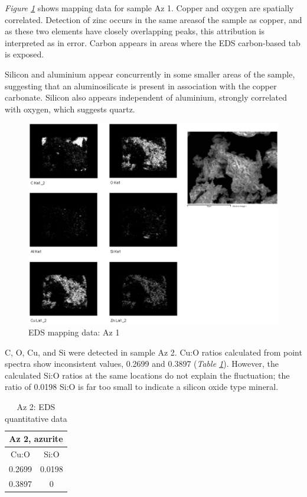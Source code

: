 \textit{Figure \ref{fig:az1_map1}} shows mapping data for sample Az 1. Copper and oxygen are spatially correlated. Detection of zinc occurs in the same areasof the sample as copper, and as these two elements have closely overlapping peaks, this attribution is interpreted as in error. Carbon appears in areas where the EDS carbon-based tab is exposed.

Silicon and aluminium appear concurrently in some smaller areas of the sample, suggesting that an aluminosilicate is present in association with the copper carbonate. Silicon also appears independent of aluminium, strongly correlated with oxygen, which suggests quartz. 

\begin{figure}[H]
\centering
  \includegraphics[width=0.9\linewidth]{Az1_EDS_map2_250221_imgs}
\caption[EDS mapping data: Az 1]{EDS mapping data: Az 1}
\label{fig:az1_map1}
\end{figure}



C, O, Cu, and Si were detected in sample Az 2. Cu:O ratios calculated from point spectra show inconsistent values, 0.2699 and 0.3897 (\textit{Table \ref{table:az2_ratios}}). However, the calculated Si:O ratios at the same locations do not explain the fluctuation; the ratio of 0.0198 Si:O is far too small to indicate a silicon oxide type mineral.

\begin{table}[H]
\caption{Az 2: EDS quantitative data}
\centering
\label{table:az2_ratios}
\begin{tabular}{c c}
\toprule
\multicolumn{2}{c}{Az 2, azurite} \\
\midrule
Cu:O & Si:O \\
\midrule
0.2699 & 0.0198 \\
0.3897 & 0 \\
\bottomrule
\end{tabular}
\end{table}

